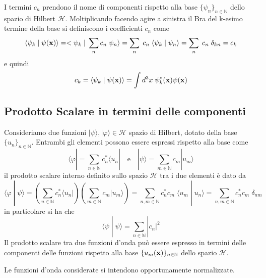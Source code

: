 \noindent I termini $c_n$ prendono il nome di componenti rispetto alla base $\{\psi_n\}_{n \in \mathbb{N}}$ dello spazio di Hilbert $\mathcal{H}$. Moltiplicando facendo agire a sinistra il Bra del k-esimo termine della base si definiscono i coefficienti $c_n$ come 
\begin{equation*}
	 \langle \psi_k \;|\;\psi(\bold{x})\rangle = <\psi_k \;|\; \sum_{n}c_n \; \psi_{n} \rangle = \sum_{n}\; c_n \; \langle \psi_k \;|\; \psi_n\rangle = \sum_{n} \; c_n \; \delta_{kn} = c_k  
\end{equation*} 
e quindi 
\begin{equation}
	c_k = \langle \psi_k \; | \; \psi (\bold{x}) \rangle = \int d^3x \; \psi_k^*(\bold{x}) \psi (\bold{x})
\end{equation}


\subsection{Prodotto Scalare in termini delle componenti}

Consideriamo due funzioni $|\psi\rangle , |\varphi \rangle \in \mathcal{H}$ spazio di Hilbert, dotato della base $\{u_n\}_{n \in \mathbb{N}}$. Entrambi gli elementi possono essere espressi rispetto alla base come 
\begin{equation*}
	\langle \varphi | = \sum_{n \in \mathbb{N}} c_n^* \langle u_n| \quad \text{e} \quad |\psi \rangle = \sum_{m \in \mathbb{N}} c_m |u_m \rangle 
\end{equation*} 
il prodotto scalare interno definito sullo spazio $\mathcal{H}$ tra i due elementi \`e dato da
\begin{equation*}
	\langle \varphi \;|\; \psi \rangle = \left (\sum_{n \in \mathbb{N}} c_n^* \langle u_n| \right )\left ( \sum_{m \in \mathbb{N}} c_m |u_m \rangle \right )  = \sum_{n,m \in \mathbb{N}} c_n^*c_m \;\langle u_m \;|\; u_n \rangle = \sum_{n,m \in \mathbb{N}} c_n^*c_m \; \delta_{nm} 
\end{equation*}
in particolare si ha che 
\begin{equation*}
	\langle \psi \;|\; \psi \rangle = \sum_{n \in \mathbb{N}} |c_n|^2
\end{equation*}
Il prodotto scalare tra due funzioni d'onda pu\`o essere espresso in termini delle componenti delle funzioni rispetto alla base $\{ u_m (\bold{x})\}_{n \in \mathbb{N}}$ dello spazio $\mathcal{H}$.
\newline

\begin{remark} Le funzioni d'onda considerate si intendono opportunamente normalizzate.	
\end{remark}


